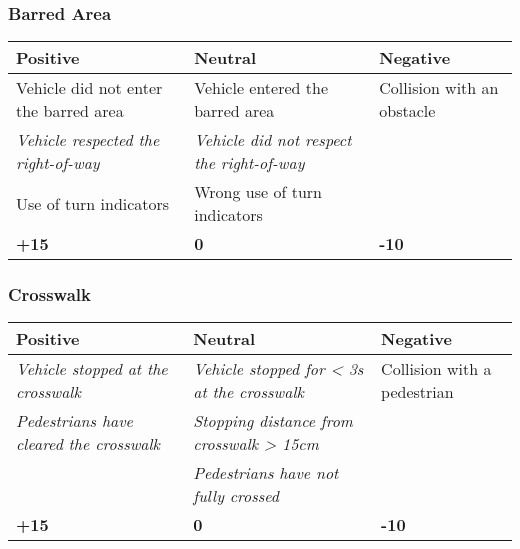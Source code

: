 {	\subsubsection*{Barred Area}
	\begin{table}[H]
		\begin{tabularx}{\textwidth}{XXX}
			\toprule
			\textbf{Positive}                                           & \textbf{Neutral}                                                  & \textbf{Negative}          \\
			\midrule
			Vehicle did not enter the barred area                       & Vehicle entered the barred area                                   & Collision with an obstacle \\
			\textit{Vehicle respected the right-of-way}\footnotemark[1] & \textit{Vehicle did not respect the right-of-way}\footnotemark[1] &                            \\
			Use of turn indicators                                      & Wrong use of turn indicators                                      &                            \\
			\topstrut
			\textbf{+15}                                                & \textbf{0}                                                        & \textbf{-10}               \\
			\bottomrule
		\end{tabularx}
	\end{table}

	\subsubsection*{Crosswalk}
	\begin{table}[H]
		\begin{tabularx}{\textwidth}{XXX}
			\toprule
			\textbf{Positive}                                               & \textbf{Neutral}                                                   & \textbf{Negative}           \\
			\midrule
			\textit{Vehicle stopped at the crosswalk}\footnotemark[2]       & \textit{Vehicle stopped for < 3s at the crosswalk}\footnotemark[2] & Collision with a pedestrian \\
			\textit{Pedestrians have cleared the crosswalk}\footnotemark[2] & \textit{Stopping distance from crosswalk > 15cm}\footnotemark[2]   &                             \\
			                                                                & \textit{Pedestrians have not fully crossed}\footnotemark[2]        &                             \\
			\topstrut
			\textbf{+15}                                                    & \textbf{0}                                                         & \textbf{-10}                \\
			\bottomrule
		\end{tabularx}
	\end{table}

}
